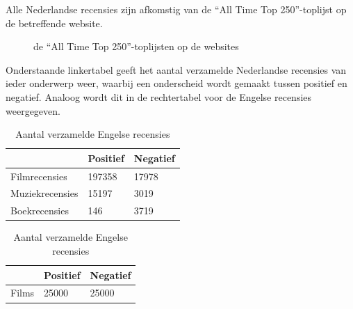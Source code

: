 Alle Nederlandse recensies zijn afkomstig van de ``All Time Top 250''-toplijst op de betreffende website.

\begin{figure}%
    \centering
    \caption{de ``All Time Top 250''-toplijsten op de websites}%
\end{figure}

Onderstaande linkertabel geeft het aantal verzamelde Nederlandse recensies van ieder onderwerp weer, waarbij een onderscheid wordt gemaakt tussen positief en negatief. Analoog wordt dit in de rechtertabel voor de Engelse recensies weergegeven.\\

\begin{table}[h]
\centering
\setlength\tabcolsep{2pt}
\begin{minipage}[t]{0.48\textwidth}
\centering
\begin{tabular}{l|l|l|}
\cline{2-3}
                                      & Positief & Negatief \\ \hline
\multicolumn{1}{|l|}{Filmrecensies}   & 197358   & 17978    \\ \hline
\multicolumn{1}{|l|}{Muziekrecensies} & 15197    & 3019     \\ \hline
\multicolumn{1}{|l|}{Boekrecensies}   & 146      & 3719     \\ \hline
\end{tabular}
\caption{Aantal verzamelde Nederlandse recensies} 
\label{tabel: aantal verzamelde Nederlandse recensies}
\end{minipage}%
\hfill
\begin{minipage}[t]{0.48\textwidth}
\centering
\begin{tabular}{l|l|l|}
\cline{2-3}
                            & Positief & Negatief \\ \hline
\multicolumn{1}{|l|}{Films} & 25000   & 25000    \\ \hline
\end{tabular}
\caption{Aantal verzamelde Engelse recensies}
\end{minipage}
\end{table}

